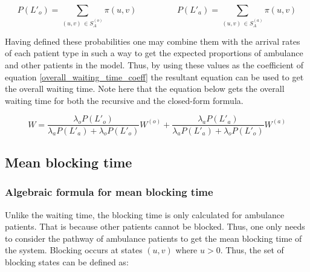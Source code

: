 \begin{equation*}
    P(L'_o) = \sum_{(u,v) \, \in S_A^{(o)}} \pi(u,v) \hspace{2cm}
    P(L'_a) = \sum_{(u,v) \, \in S_A^{(a)}} \pi(u,v)
\end{equation*}

Having defined these probabilities one may combine them with the arrival rates of 
each patient type in such a way to get the expected proportions of ambulance and 
other patients in the model. 
Thus, by using these values as the coefficient of equation \ref{overall_waiting_time_coeff} 
the resultant equation can be used to get the overall waiting time. 
Note here that the equation below gets the overall waiting time for both the recursive 
and the closed-form formula.

\begin{equation}\label{overall_waiting_time}
    W = \frac{\lambda_o P(L'_o)}{\lambda_a P(L'_a) + \lambda_o P(L'_o)} W^{(o)} + 
    \frac{\lambda_a P(L'_a)}{\lambda_a P(L'_a) + \lambda_o P(L'_o)} W^{(a)}
\end{equation}





\subsection{Mean blocking time}

\subsubsection{Algebraic formula for mean blocking time}

Unlike the waiting time, the blocking time is only calculated for ambulance patients.  %
That is because other patients cannot be blocked. Thus, one only needs to consider 
the pathway of ambulance patients to get the mean blocking time of the system. Blocking occurs at states \((u,v)\) 
where \(u > 0 \). Thus, the set of blocking states can be defined as:

